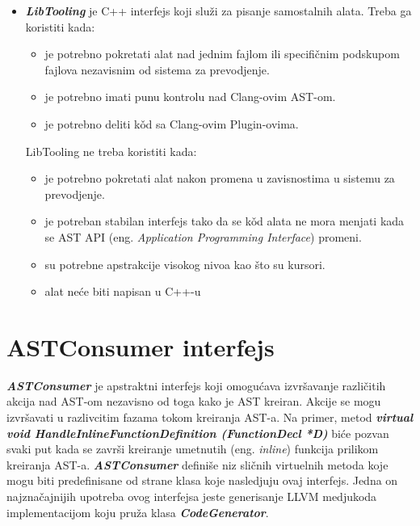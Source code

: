 \documentclass[12pt,oneside]{memoir}
\begin{document}
\begin{itemize}
\item \textit{\textbf{LibTooling}} je C++ interfejs koji slu\v{z}i za pisanje samostalnih alata.
Treba ga koristiti kada:
\begin{itemize}
  \item je potrebno pokretati alat nad jednim fajlom ili specifi\v{c}nim podskupom fajlova nezavisnim od sistema za prevodjenje.
  \item je potrebno imati punu kontrolu nad Clang-ovim AST-om.
  \item je potrebno deliti k\v{o}d sa Clang-ovim Plugin-ovima.
\end{itemize}
LibTooling ne treba koristiti kada:
\begin{itemize}
  \item je potrebno pokretati alat nakon promena u zavisnostima u sistemu za prevodjenje.
  \item je potreban stabilan interfejs tako da se k\v{o}d alata ne mora menjati kada se AST API (eng. \textit{Application Programming Interface}) promeni.
  \item su potrebne apstrakcije visokog nivoa kao \v{s}to su kursori.
  \item alat ne\'{c}e biti napisan u C++-u
\end{itemize}
\end{itemize}

\section{ASTConsumer interfejs}

\textit{\textbf{ASTConsumer}} je apstraktni interfejs koji omogu\'{c}ava izvr\v{s}avanje razli\v{c}itih akcija nad AST-om nezavisno od toga kako je AST kreiran.
Akcije se mogu izvr\v{s}avati u razli{v}citim fazama tokom kreiranja AST-a. Na primer, metod \textit{\textbf{virtual void  HandleInlineFunctionDefinition (FunctionDecl *D)}} bi\'{c}e pozvan svaki put kada se zavr\v{s}i kreiranje umetnutih (eng. \textit{inline}) funkcija prilikom kreiranja AST-a. \textit{\textbf{ASTConsumer}} defini\v{s}e niz sli\v{c}nih virtuelnih metoda koje mogu biti predefinisane od strane klasa koje nasledjuju ovaj interfejs. Jedna on najzna\v{c}ajnijih upotreba ovog interfejsa jeste generisanje LLVM medjukoda implementacijom koju pru\v{z}a klasa \textit{\textbf{CodeGenerator}}. 
\end{document}
